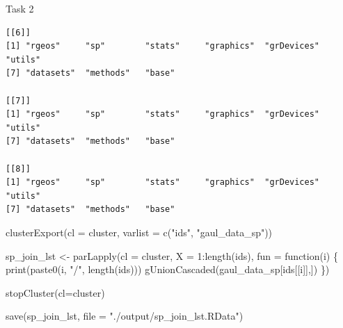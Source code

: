 \documentclass[
  ignorenonframetext,
  aspectratio=169,
]{beamer}
\newenvironment{Shaded}{\begin{snugshade}}{\end{snugshade}}
\newcommand{\AttributeTok}[1]{\textcolor[rgb]{0.40,0.45,0.13}{#1}}
\newcommand{\ControlFlowTok}[1]{\textcolor[rgb]{0.00,0.23,0.31}{#1}}
\newcommand{\DecValTok}[1]{\textcolor[rgb]{0.68,0.00,0.00}{#1}}
\newcommand{\FunctionTok}[1]{\textcolor[rgb]{0.28,0.35,0.67}{#1}}
\newcommand{\NormalTok}[1]{\textcolor[rgb]{0.00,0.23,0.31}{#1}}
\newcommand{\OtherTok}[1]{\textcolor[rgb]{0.00,0.23,0.31}{#1}}
\newcommand{\SpecialCharTok}[1]{\textcolor[rgb]{0.37,0.37,0.37}{#1}}
\newcommand{\StringTok}[1]{\textcolor[rgb]{0.13,0.47,0.30}{#1}}
\begin{document}
\begin{frame}[fragile]{Task 2}
\begin{verbatim}
[[6]]
[1] "rgeos"     "sp"        "stats"     "graphics"  "grDevices" "utils"    
[7] "datasets"  "methods"   "base"     

[[7]]
[1] "rgeos"     "sp"        "stats"     "graphics"  "grDevices" "utils"    
[7] "datasets"  "methods"   "base"     

[[8]]
[1] "rgeos"     "sp"        "stats"     "graphics"  "grDevices" "utils"    
[7] "datasets"  "methods"   "base"     
\end{verbatim}

\begin{Shaded}
\begin{Highlighting}[]
\FunctionTok{clusterExport}\NormalTok{(}\AttributeTok{cl =}\NormalTok{ cluster, }\AttributeTok{varlist =} \FunctionTok{c}\NormalTok{(}\StringTok{"ids"}\NormalTok{, }\StringTok{"gaul\_data\_sp"}\NormalTok{))}

\NormalTok{sp\_join\_lst }\OtherTok{\textless{}{-}} \FunctionTok{parLapply}\NormalTok{(}\AttributeTok{cl =}\NormalTok{ cluster, }\AttributeTok{X =} \DecValTok{1}\SpecialCharTok{:}\FunctionTok{length}\NormalTok{(ids), }\AttributeTok{fun =} \ControlFlowTok{function}\NormalTok{(i) \{}
  \FunctionTok{print}\NormalTok{(}\FunctionTok{paste0}\NormalTok{(i, }\StringTok{"/"}\NormalTok{, }\FunctionTok{length}\NormalTok{(ids)))}
  \FunctionTok{gUnionCascaded}\NormalTok{(gaul\_data\_sp[ids[[i]],])}
\NormalTok{\})}

\FunctionTok{stopCluster}\NormalTok{(}\AttributeTok{cl=}\NormalTok{cluster)}

\FunctionTok{save}\NormalTok{(sp\_join\_lst, }\AttributeTok{file =} \StringTok{"./output/sp\_join\_lst.RData"}\NormalTok{)}
\end{Highlighting}
\end{Shaded}

\linespread{2}

\linespread{0.5}


\end{frame}
\end{document}

